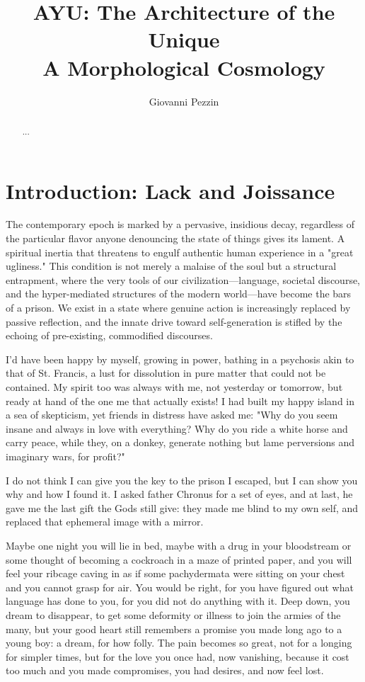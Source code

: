 \documentclass[12pt,a4paper]{report}
\title{AYU: The Architecture of the Unique \\ \large A Morphological Cosmology}
\author{Giovanni Pezzin}
\begin{document}
\maketitle

\begin{abstract}
...
\end{abstract}

\chapter*{Introduction: Lack and Joissance}
The contemporary epoch is marked by a pervasive, insidious decay, regardless of the particular flavor anyone denouncing the state of things gives its lament. A spiritual inertia that threatens to engulf authentic human experience in a "great ugliness." This condition is not merely a malaise of the soul but a structural entrapment, where the very tools of our civilization—language, societal discourse, and the hyper-mediated structures of the modern world—have become the bars of a prison. We exist in a state where genuine action is increasingly replaced by passive reflection, and the innate drive toward self-generation is stifled by the echoing of pre-existing, commodified discourses.

I'd have been happy by myself, growing in power, bathing in a psychosis akin to that of St. Francis, a lust for dissolution in pure matter that could not be contained. My spirit too was always with me, not yesterday or tomorrow, but ready at hand of the one me that actually exists! I had built my happy island in a sea of skepticism, yet friends in distress have asked me: "Why do you seem insane and always in love with everything? Why do you ride a white horse and carry peace, while they, on a donkey, generate nothing but lame perversions and imaginary wars, for profit?"

I do not think I can give you the key to the prison I escaped, but I can show you why and how I found it. I asked father Chronus for a set of eyes, and at last, he gave me the last gift the Gods still give: they made me blind to my own self, and replaced that ephemeral image with a mirror.

Maybe one night you will lie in bed, maybe with a drug in your bloodstream or some thought of becoming a cockroach in a maze of printed paper, and you will feel your ribcage caving in as if some pachydermata were sitting on your chest and you cannot grasp for air. You would be right, for you have figured out what language has done to you, for you did not do anything with it. Deep down, you dream to disappear, to get some deformity or illness to join the armies of the many, but your good heart still remembers a promise you made long ago to a young boy: a dream, for how folly. The pain becomes so great, not for a longing for simpler times, but for the love you once had, now vanishing, because it cost too much and you made compromises, you had desires, and now feel lost.
\end{document}
